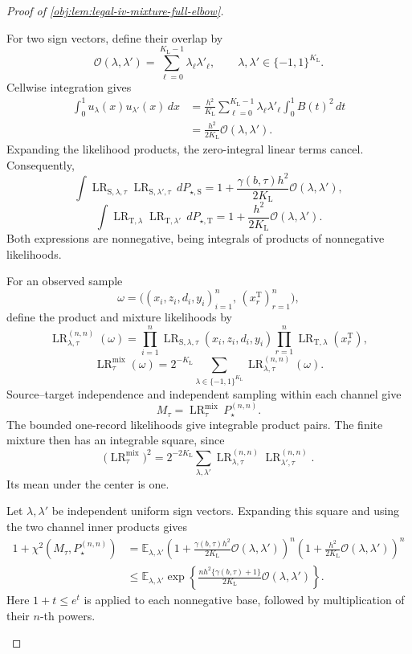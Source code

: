 \documentclass[11pt]{article}
\begin{document}
\begin{proof}[Proof of \cref{obj:lem:legal-iv-mixture-full-elbow}]
\begin{enumerate}
For two sign vectors, define their overlap by
\[
\mathscr O(\lambda,\lambda')
=
\sum_{\ell=0}^{K_{\mathrm L}-1}\lambda_{\ell}\lambda'_{\ell},
\qquad
\lambda,\lambda'\in\{-1,1\}^{K_{\mathrm L}}.
\]
Cellwise integration gives
\[
\begin{aligned}
\int_0^1u_{\lambda}(x)u_{\lambda'}(x)\,dx
&=
\frac{h^2}{K_{\mathrm L}}
\sum_{\ell=0}^{K_{\mathrm L}-1}
\lambda_{\ell}\lambda'_{\ell}\int_0^1B(t)^2\,dt\\
&=\frac{h^2}{2K_{\mathrm L}}\mathscr O(\lambda,\lambda').
\end{aligned}
\]
Expanding the likelihood products, the zero-integral linear terms cancel. Consequently,
\[
\int
\operatorname{LR}_{\mathrm S,\lambda,\tau}
\operatorname{LR}_{\mathrm S,\lambda',\tau}\,dP_{\star,\mathrm S}
=
1+\frac{\gamma(b,\tau)h^2}{2K_{\mathrm L}}
\mathscr O(\lambda,\lambda'),
\]
\[
\int
\operatorname{LR}_{\mathrm T,\lambda}
\operatorname{LR}_{\mathrm T,\lambda'}\,dP_{\star,\mathrm T}
=
1+\frac{h^2}{2K_{\mathrm L}}
\mathscr O(\lambda,\lambda').
\]
Both expressions are nonnegative, being integrals of products of nonnegative likelihoods.

For an observed sample
\[
\omega=
\bigl((x_i,z_i,d_i,y_i)_{i=1}^n,\,
(x_r^{\mathrm T})_{r=1}^n\bigr),
\]
define the product and mixture likelihoods by
\[
\operatorname{LR}_{\lambda,\tau}^{(n,n)}(\omega)
=
\prod_{i=1}^n
\operatorname{LR}_{\mathrm S,\lambda,\tau}(x_i,z_i,d_i,y_i)
\prod_{r=1}^n
\operatorname{LR}_{\mathrm T,\lambda}(x_r^{\mathrm T}),
\]
\[
\operatorname{LR}_{\tau}^{\mathrm{mix}}(\omega)
=
2^{-K_{\mathrm L}}
\sum_{\lambda\in\{-1,1\}^{K_{\mathrm L}}}
\operatorname{LR}_{\lambda,\tau}^{(n,n)}(\omega).
\]
Source--target independence and independent sampling within each channel give
\[
M_{\tau}
=
\operatorname{LR}_{\tau}^{\mathrm{mix}}\,P_{\star}^{(n,n)}.
\]
The bounded one-record likelihoods give integrable product pairs. The finite mixture then has an integrable square, since
\[
\bigl(\operatorname{LR}_{\tau}^{\mathrm{mix}}\bigr)^2
=
2^{-2K_{\mathrm L}}
\sum_{\lambda,\lambda'}
\operatorname{LR}_{\lambda,\tau}^{(n,n)}
\operatorname{LR}_{\lambda',\tau}^{(n,n)}.
\]
Its mean under the center is one.

Let \(\lambda,\lambda'\) be independent uniform sign vectors. Expanding this square and using the two channel inner products gives
\[
\begin{aligned}
1+\chi^2(M_{\tau},P_{\star}^{(n,n)})
&=
\mathbb E_{\lambda,\lambda'}
\left(1+
\frac{\gamma(b,\tau)h^2}{2K_{\mathrm L}}
\mathscr O(\lambda,\lambda')\right)^n
\left(1+
\frac{h^2}{2K_{\mathrm L}}
\mathscr O(\lambda,\lambda')\right)^n\\
&\le
\mathbb E_{\lambda,\lambda'}
\exp\left\{
\frac{nh^2\{\gamma(b,\tau)+1\}}
{2K_{\mathrm L}}\mathscr O(\lambda,\lambda')
\right\}.
\end{aligned}
\]
Here \(1+t\le e^t\) is applied to each nonnegative base, followed by multiplication of their \(n\)-th powers.


\end{enumerate}
\end{proof}
\end{document}
